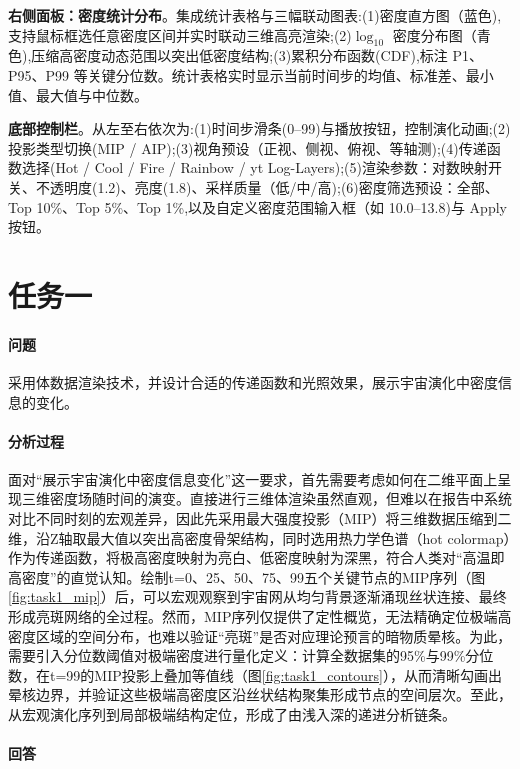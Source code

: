 \documentclass[12pt,a4paper]{article}
\begin{document}
\textbf{右侧面板：密度统计分布}。集成统计表格与三幅联动图表:(1)密度直方图（蓝色),支持鼠标框选任意密度区间并实时联动三维高亮渲染;(2)$\log_{10}$ 密度分布图（青色),压缩高密度动态范围以突出低密度结构;(3)累积分布函数(CDF),标注 P1、P95、P99 等关键分位数。统计表格实时显示当前时间步的均值、标准差、最小值、最大值与中位数。

\textbf{底部控制栏}。从左至右依次为:(1)时间步滑条(0--99)与播放按钮，控制演化动画;(2)投影类型切换(MIP / AIP);(3)视角预设（正视、侧视、俯视、等轴测);(4)传递函数选择(Hot / Cool / Fire / Rainbow / yt Log-Layers);(5)渲染参数：对数映射开关、不透明度(1.2)、亮度(1.8)、采样质量（低/中/高);(6)密度筛选预设：全部、Top 10\%、Top 5\%、Top 1\%,以及自定义密度范围输入框（如 10.0--13.8)与 Apply 按钮。

\section{任务一}

\paragraph{问题}
采用体数据渲染技术，并设计合适的传递函数和光照效果，展示宇宙演化中密度信息的变化。

\paragraph{分析过程}
面对``展示宇宙演化中密度信息变化''这一要求，首先需要考虑如何在二维平面上呈现三维密度场随时间的演变。直接进行三维体渲染虽然直观，但难以在报告中系统对比不同时刻的宏观差异，因此先采用最大强度投影（MIP）将三维数据压缩到二维，沿Z轴取最大值以突出高密度骨架结构，同时选用热力学色谱（hot colormap）作为传递函数，将极高密度映射为亮白、低密度映射为深黑，符合人类对``高温即高密度''的直觉认知。绘制t=0、25、50、75、99五个关键节点的MIP序列（图\ref{fig:task1_mip}）后，可以宏观观察到宇宙网从均匀背景逐渐涌现丝状连接、最终形成亮斑网络的全过程。然而，MIP序列仅提供了定性概览，无法精确定位极端高密度区域的空间分布，也难以验证``亮斑''是否对应理论预言的暗物质晕核。为此，需要引入分位数阈值对极端密度进行量化定义：计算全数据集的95\%与99\%分位数，在t=99的MIP投影上叠加等值线（图\ref{fig:task1_contours}），从而清晰勾画出晕核边界，并验证这些极端高密度区沿丝状结构聚集形成节点的空间层次。至此，从宏观演化序列到局部极端结构定位，形成了由浅入深的递进分析链条。

\paragraph{回答}
\end{document}
